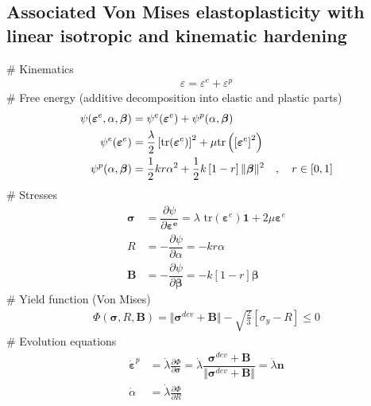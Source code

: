 \documentclass[]{scrartcl}
\begin{document}
\subsection{Associated Von Mises elastoplasticity with linear isotropic and kinematic hardening}
\begin{easylist}
# Kinematics
\begin{gather*}
\varepsilon
  = \varepsilon^{e} + \varepsilon^{p}
\end{gather*}
# Free energy (additive decomposition into elastic and plastic parts)
\begin{align*}
\psi (\boldsymbol{\varepsilon}^{e}, \alpha, \boldsymbol{\beta})
 &= \psi^{e} (\boldsymbol{\varepsilon}^{e})
  + \psi^{p} (\alpha, \boldsymbol{\beta}) \\
\psi^{e} (\boldsymbol{\varepsilon}^{e})
 &= \frac{\lambda}{2} \left[ \textnormal{tr} (\boldsymbol{\varepsilon}^{e}) \right]^{2} 
   + \mu \textnormal{tr} \left( \left[\boldsymbol{\varepsilon}^{e} \right]^{2} \right) \\  
\psi^{p} (\alpha, \boldsymbol{\beta})
 &= \frac{1}{2} k r \alpha^{2} + \frac{1}{2} k \left[ 1 - r \right] \Vert \boldsymbol{\beta} \Vert^{2}
 \quad , \quad r \in \left[ 0,1 \right]
\end{align*}
# Stresses
\begin{align*}
\boldsymbol{\sigma} 
 &=  \dfrac{\partial \psi}{\partial \boldsymbol{\varepsilon^{e}}} 
  = \lambda \textrm{ tr}(\boldsymbol{\varepsilon}^{e}) \mathbf{1} + 2\mu\boldsymbol{\varepsilon}^{e} \\
R 
 &= - \dfrac{\partial \psi}{\partial \alpha}
  = - k r \alpha \\
\boldsymbol{B}
 &= - \dfrac{\partial \psi}{\partial \boldsymbol{\beta}}
  = -k \left[ 1 - r \right] \boldsymbol{\beta}
\end{align*}
# Yield function (Von Mises)
\begin{gather*}
\Phi \left( \boldsymbol{\sigma},R,\boldsymbol{B} \right)
  = \Vert \boldsymbol{\sigma}^{dev} + \boldsymbol{B} \Vert - \sqrt{\frac{2}{3}} \left[ \sigma_{y} - R \right]
  \leq 0
\end{gather*}
# Evolution equations
\begin{align*}
\dot{\boldsymbol{\varepsilon}}^{p} 
 &= \dot{\lambda} \frac{\partial \Phi}{\partial \boldsymbol{\sigma}}
  = \dot{\lambda} \dfrac{\boldsymbol{\sigma}^{dev} + \boldsymbol{B}}{\Vert \boldsymbol{\sigma}^{dev} + \boldsymbol{B} \Vert}
  = \dot{\lambda} \boldsymbol{n}
\\
\dot{\alpha} 
 &= \dot{\lambda} \frac{\partial \Phi}{\partial R}

\end{align*}
\end{easylist}
\end{document}
